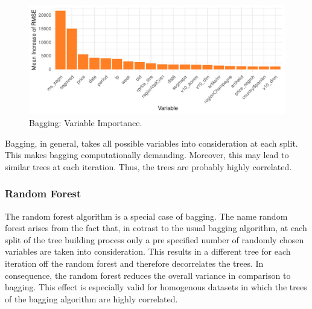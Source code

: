 \documentclass[11pt,]{article}
\begin{document}
\begin{figure}

\includegraphics{../00_data/output_paper/15_var_imp_bagging} \hfill{}

\caption{\label{fig:bagvarimp}Bagging: Variable Importance.}\label{fig:bag_varimp}
\end{figure}

Bagging, in general, takes all possible variables into consideration at
each split. This makes \ac{bagging} computationally demanding. Moreover,
this may lead to similar trees at each iteration. Thus, the trees are
probably highly correlated.

\hypertarget{random-forest}{%
\subsubsection{Random Forest}\label{random-forest}}

The random forest algorithm is a special case of \ac{bagging}. The name
random forest arises from the fact that, in cotrast to the usual
\ac{bagging} algorithm, at each split of the tree building process only
a pre specified number of randomly chosen variables are taken into
consideration. This results in a different tree for each iteration off
the random forest and therefore decorrelates the trees. In consequence,
the random forest reduces the overall variance in comparison to
\ac{bagging}. This effect is especially valid for homogenous datasets in
which the trees of the \ac{bagging} algorithm are highly correlated.
\end{document}
